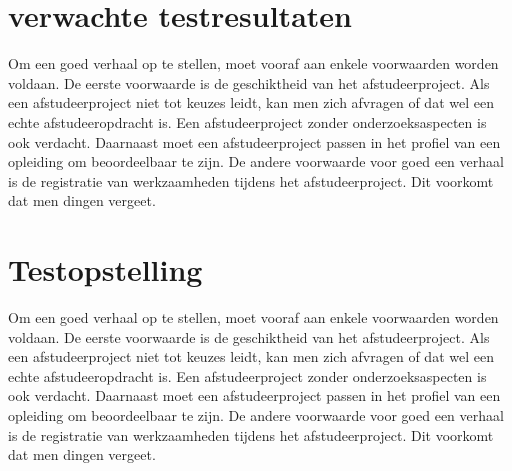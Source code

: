 	
	\section{verwachte testresultaten}
	
	Om een goed verhaal op te stellen, moet vooraf aan enkele voorwaarden
	worden voldaan. De eerste voorwaarde is de geschiktheid van het
	afstudeerproject. Als een afstudeerproject niet tot keuzes leidt, kan
	men zich afvragen of dat wel een echte afstudeeropdracht is. Een
	afstudeerproject zonder onderzoeksaspecten is ook verdacht. Daarnaast
	moet een afstudeerproject passen in het profiel van een opleiding om
	beoordeelbaar te zijn. De andere voorwaarde voor goed een verhaal is
	de registratie van werkzaamheden tijdens het afstudeerproject. Dit
	voorkomt dat men dingen vergeet.
	
	\section{Testopstelling}
	
	Om een goed verhaal op te stellen, moet vooraf aan enkele voorwaarden
	worden voldaan. De eerste voorwaarde is de geschiktheid van het
	afstudeerproject. Als een afstudeerproject niet tot keuzes leidt, kan
	men zich afvragen of dat wel een echte afstudeeropdracht is. Een
	afstudeerproject zonder onderzoeksaspecten is ook verdacht. Daarnaast
	moet een afstudeerproject passen in het profiel van een opleiding om
	beoordeelbaar te zijn. De andere voorwaarde voor goed een verhaal is
	de registratie van werkzaamheden tijdens het afstudeerproject. Dit
	voorkomt dat men dingen vergeet.
	
	
	\begin{center}
	\end{center}
	
 
	
	
		
